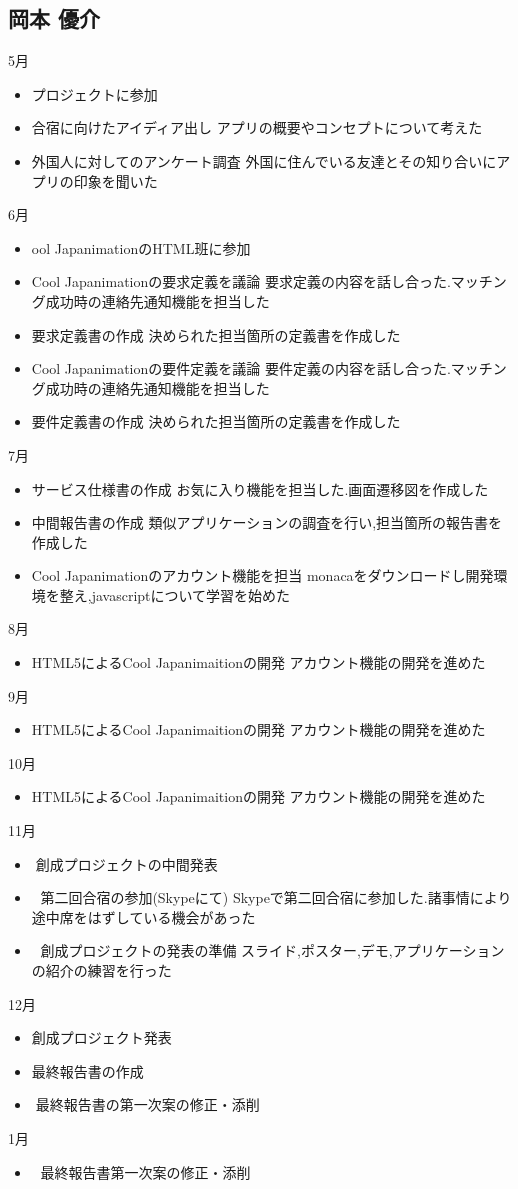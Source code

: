 \subsection{岡本 優介}
5月
\begin{itemize}
\item プロジェクトに参加
\item 合宿に向けたアイディア出し
アプリの概要やコンセプトについて考えた
\item 外国人に対してのアンケート調査
外国に住んでいる友達とその知り合いにアプリの印象を聞いた
\end{itemize}
6月
\begin{itemize}
\item ool JapanimationのHTML班に参加
\item Cool Japanimationの要求定義を議論
要求定義の内容を話し合った.マッチング成功時の連絡先通知機能を担当した
\item 要求定義書の作成
決められた担当箇所の定義書を作成した
\item Cool Japanimationの要件定義を議論
要件定義の内容を話し合った.マッチング成功時の連絡先通知機能を担当した
\item 要件定義書の作成
決められた担当箇所の定義書を作成した
\end{itemize}
7月
\begin{itemize}
\item サービス仕様書の作成
お気に入り機能を担当した.画面遷移図を作成した
\item 中間報告書の作成
類似アプリケーションの調査を行い,担当箇所の報告書を作成した
\item Cool Japanimationのアカウント機能を担当
monacaをダウンロードし開発環境を整え,javascriptについて学習を始めた
\end{itemize}
8月
\begin{itemize}
\item HTML5によるCool Japanimaitionの開発
アカウント機能の開発を進めた
\end{itemize}
9月
\begin{itemize}
\item HTML5によるCool Japanimaitionの開発
アカウント機能の開発を進めた
\end{itemize}
10月
\begin{itemize}
\item HTML5によるCool Japanimaitionの開発
アカウント機能の開発を進めた
\end{itemize}
11月
\begin{itemize}
\item創成プロジェクトの中間発表
\item 	第二回合宿の参加(Skypeにて)
Skypeで第二回合宿に参加した.諸事情により途中席をはずしている機会があった
\item	創成プロジェクトの発表の準備
スライド,ポスター,デモ,アプリケーションの紹介の練習を行った
\end{itemize}
12月
\begin{itemize}
\item 創成プロジェクト発表
\item 最終報告書の作成
\item最終報告書の第一次案の修正・添削
\end{itemize}
1月
\begin{itemize}
\item	最終報告書第一次案の修正・添削
\end{itemize}
